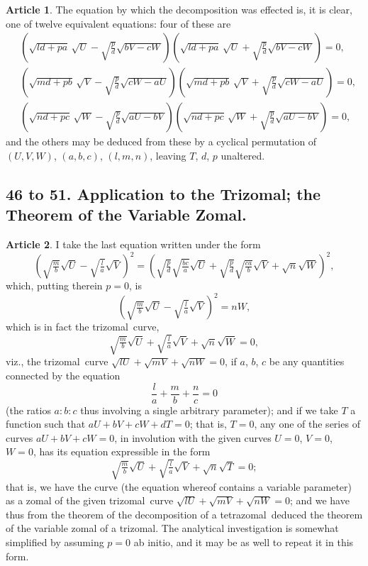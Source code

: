 \documentclass[11pt,a4paper]{article}
\theoremstyle{definition}
\newtheorem{art}{Article}
\newcommand{\trizomal}{trizomal}
\newcommand{\tetrazomal}{tetrazomal}
\begin{document}
\begin{art}
The equation by which the decomposition was effected is, it is clear, one of twelve equivalent equations: four of these are
\begin{align*}
&\left(\sqrt{ld + pa}\,\sqrt{U} - \sqrt{\tfrac{p}{d}}\sqrt{bV - cW}\right) \left(\sqrt{ld + pa}\,\sqrt{U} + \sqrt{\tfrac{p}{d}}\sqrt{bV - cW}\right) = 0, \\
&\left(\sqrt{md + pb}\,\sqrt{V} - \sqrt{\tfrac{p}{d}}\sqrt{cW - aU}\right) \left(\sqrt{md + pb}\,\sqrt{V} + \sqrt{\tfrac{p}{d}}\sqrt{cW - aU}\right) = 0, \\
&\left(\sqrt{nd + pc}\,\sqrt{W} - \sqrt{\tfrac{p}{d}}\sqrt{aU - bV}\right) \left(\sqrt{nd + pc}\,\sqrt{W} + \sqrt{\tfrac{p}{d}}\sqrt{aU - bV}\right) = 0,
\end{align*}
and the others may be deduced from these by a cyclical permutation of $(U, V, W)$, $(a, b, c)$, $(l, m, n)$, leaving $T$, $d$, $p$ unaltered.
\end{art}



\subsection{46 to 51. Application to the Trizomal; the Theorem of the Variable Zomal.}

\begin{art}
I take the last equation written under the form
\[
\left(\sqrt{\tfrac{m}{b}}\sqrt{U} - \sqrt{\tfrac{l}{a}}\sqrt{V}\right)^{2} = \left(\sqrt{\tfrac{p}{d}}\sqrt{\tfrac{bc}{a}}\sqrt{U} + \sqrt{\tfrac{p}{d}}\sqrt{\tfrac{ca}{b}}\sqrt{V} + \sqrt{n}\sqrt{W}\right)^{2},
\]
which, putting therein $p = 0$, is
\[
\left(\sqrt{\tfrac{m}{b}}\sqrt{U} - \sqrt{\tfrac{l}{a}}\sqrt{V}\right)^{2} = nW,
\]
which is in fact the \trizomal\ curve,
\[
\sqrt{\tfrac{m}{b}}\sqrt{U} + \sqrt{\tfrac{l}{a}}\sqrt{V} + \sqrt{n}\sqrt{W} = 0,
\]
viz., the \trizomal\ curve $\sqrt{lU} + \sqrt{mV} + \sqrt{nW} = 0$, if $a$, $b$, $c$ be any quantities connected by the equation
\[
\frac{l}{a} + \frac{m}{b} + \frac{n}{c} = 0
\]
(the ratios $a : b : c$ thus involving a single arbitrary parameter); and if we take $T$ a function such that $aU + bV + cW + dT = 0$; that is, $T = 0$, any one of the series of curves $aU + bV + cW = 0$, in involution with the given curves $U = 0$, $V = 0$, $W = 0$, has its equation expressible in the form
\[
\sqrt{\tfrac{m}{b}}\sqrt{U} + \sqrt{\tfrac{l}{a}}\sqrt{V} + \sqrt{n}\sqrt{T} = 0;
\]
that is, we have the curve (the equation whereof contains a variable parameter) as a zomal of the given \trizomal\ curve $\sqrt{lU} + \sqrt{mV} + \sqrt{nW} = 0$; and we have thus from the theorem of the decomposition of a \tetrazomal\ deduced the theorem of the variable zomal of a \trizomal. The analytical investigation is somewhat simplified by assuming $p = 0$ ab initio, and it may be as well to repeat it in this form.
\end{art}
\end{document}
